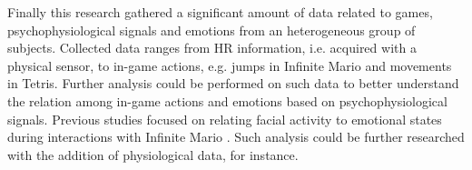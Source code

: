 Finally this research gathered a significant amount of data related to games, psychophysiological signals and emotions from an heterogeneous group of subjects. Collected data ranges from HR information, i.e. acquired with a physical sensor, to in-game actions, e.g. jumps in Infinite Mario and movements in Tetris. Further analysis could be performed on such data to better understand the relation among in-game actions and emotions based on psychophysiological signals. Previous studies focused on relating facial activity to emotional states during interactions with Infinite Mario \parencite{shaker2011feature}. Such analysis could be further researched with the addition of physiological data, for instance.
